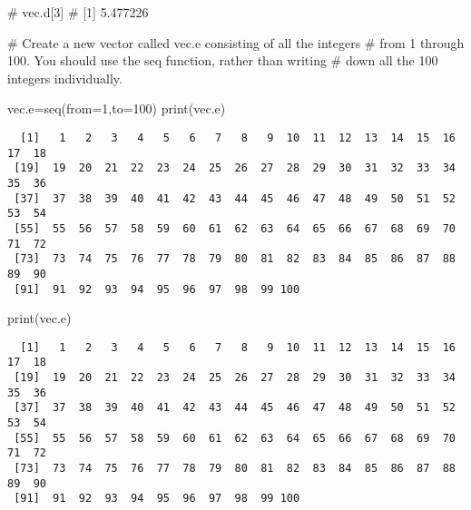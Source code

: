 \documentclass[
  letterpaper,
  DIV=11,
  numbers=noendperiod]{scrartcl}
\newenvironment{Shaded}{\begin{snugshade}}{\end{snugshade}}
\newcommand{\AttributeTok}[1]{\textcolor[rgb]{0.40,0.45,0.13}{#1}}
\newcommand{\CommentTok}[1]{\textcolor[rgb]{0.37,0.37,0.37}{#1}}
\newcommand{\DecValTok}[1]{\textcolor[rgb]{0.68,0.00,0.00}{#1}}
\newcommand{\FunctionTok}[1]{\textcolor[rgb]{0.28,0.35,0.67}{#1}}
\newcommand{\NormalTok}[1]{\textcolor[rgb]{0.00,0.23,0.31}{#1}}
\newcommand{\OtherTok}[1]{\textcolor[rgb]{0.00,0.23,0.31}{#1}}
\begin{document}
\begin{Shaded}
\begin{Highlighting}[]
\CommentTok{\# vec.d[3]}
\CommentTok{\# [1] 5.477226}



\CommentTok{\# Create a new vector called vec.e consisting of all the integers }
\CommentTok{\# from 1 through 100. You should use the seq function, rather than writing }
\CommentTok{\# down all the 100 integers individually. }


\NormalTok{vec.e}\OtherTok{=}\FunctionTok{seq}\NormalTok{(}\AttributeTok{from=}\DecValTok{1}\NormalTok{,}\AttributeTok{to=}\DecValTok{100}\NormalTok{)}
\FunctionTok{print}\NormalTok{(vec.e)}
\end{Highlighting}
\end{Shaded}

\begin{verbatim}
  [1]   1   2   3   4   5   6   7   8   9  10  11  12  13  14  15  16  17  18
 [19]  19  20  21  22  23  24  25  26  27  28  29  30  31  32  33  34  35  36
 [37]  37  38  39  40  41  42  43  44  45  46  47  48  49  50  51  52  53  54
 [55]  55  56  57  58  59  60  61  62  63  64  65  66  67  68  69  70  71  72
 [73]  73  74  75  76  77  78  79  80  81  82  83  84  85  86  87  88  89  90
 [91]  91  92  93  94  95  96  97  98  99 100
\end{verbatim}

\begin{Shaded}
\begin{Highlighting}[]
\FunctionTok{print}\NormalTok{(vec.e)}
\end{Highlighting}
\end{Shaded}

\begin{verbatim}
  [1]   1   2   3   4   5   6   7   8   9  10  11  12  13  14  15  16  17  18
 [19]  19  20  21  22  23  24  25  26  27  28  29  30  31  32  33  34  35  36
 [37]  37  38  39  40  41  42  43  44  45  46  47  48  49  50  51  52  53  54
 [55]  55  56  57  58  59  60  61  62  63  64  65  66  67  68  69  70  71  72
 [73]  73  74  75  76  77  78  79  80  81  82  83  84  85  86  87  88  89  90
 [91]  91  92  93  94  95  96  97  98  99 100
\end{verbatim}
\end{document}
